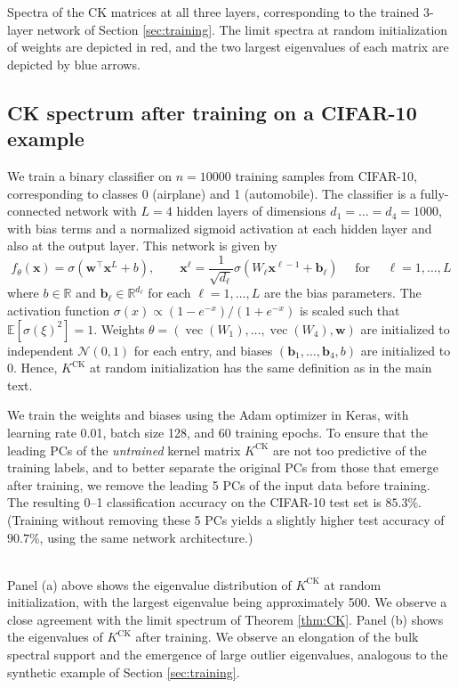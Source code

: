 \documentclass{article}
\theoremstyle{definition}
\newcommand{\R}{\mathbb{R}}
\newcommand{\N}{\mathcal{N}}
\newcommand{\E}{\mathbb{E}}
\newcommand{\CK}{\text{CK}}
\newcommand{\x}{\mathbf{x}}
\newcommand{\w}{\mathbf{w}}
\newcommand{\1}{\mathbf{1}}
\renewcommand{\vec}{\operatorname{vec}}
\begin{document}
Spectra of the CK matrices at all three layers, corresponding to the
trained 3-layer network of Section \ref{sec:training}. The limit spectra at
random initialization of weights are depicted in red, and the two largest
eigenvalues of each matrix are depicted by blue arrows.

\subsection{CK spectrum after training on a CIFAR-10
example}\label{appendix:CIFARtraining}

We train a binary classifier on $n=10000$ training samples from CIFAR-10,
corresponding to classes 0 (airplane) and 1 (automobile). The classifier is a
fully-connected network with $L=4$ hidden layers of dimensions
$d_1=\ldots=d_4=1000$, with bias terms and a normalized sigmoid activation at each hidden
layer and also at the output layer. This network is given by
\[f_\theta(\x)=\sigma(\w^\top \x^L+b),
\qquad \x^\ell=\frac{1}{\sqrt{d_\ell}}\sigma(W_\ell \x^{\ell-1}+\mathbf{b}_\ell)
\quad \text{ for } \quad \ell=1,\ldots,L\]
where $b \in \R$ and $\mathbf{b}_\ell \in \R^{d_\ell}$ for each
$\ell=1,\ldots,L$ are the bias parameters.
The activation function $\sigma(x) \propto
(1-e^{-x})/(1+e^{-x})$ is scaled such that $\E[\sigma(\xi)^2]=1$.
Weights $\theta=(\vec(W_1),\ldots,\vec(W_4),\w)$ are initialized to independent $\N(0,1)$ for each entry,
and biases $(\mathbf{b}_1,\ldots,\mathbf{b}_4,b)$ are initialized to 0.
Hence, $K^\CK$ at random initialization has the same definition as in the
main text.

We train the weights and biases using the Adam optimizer in Keras, with
learning rate 0.01, batch size 128, and 60 training epochs. To ensure that the
leading PCs of the \emph{untrained} kernel matrix $K^\CK$ are
not too predictive of the training labels, and to better separate the original
PCs from those that emerge after training, we remove the
leading 5 PCs of the input data before training. The resulting
0--1 classification accuracy on the CIFAR-10 test set
is $85.3\%$. (Training without removing these 5 PCs yields a slightly higher
test accuracy of $90.7\%$, using the same network architecture.)

%
\\

Panel (a) above shows the eigenvalue distribution of $K^\CK$ at random initialization,
with the largest eigenvalue being approximately 500. We
observe a close agreement with the limit spectrum of Theorem \ref{thm:CK}.
Panel (b) shows the eigenvalues of $K^\CK$ after training. We observe
an elongation of the bulk spectral support and the emergence of large
outlier eigenvalues, analogous to the synthetic example of Section
\ref{sec:training}.
\end{document}
